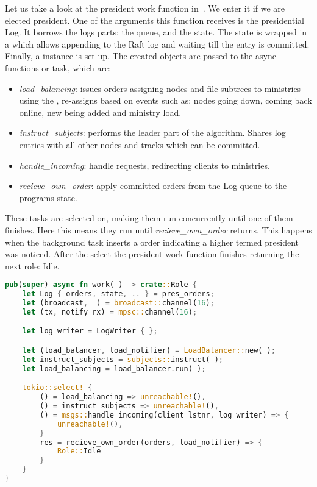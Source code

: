 Let us take a look at the president work function in~. We enter it if we are elected president. One of the arguments this function receives is the presidential \raft{} Log. It borrows the logs parts: the queue, and the \raft{} state. The state is wrapped in a  which allows appending to the Raft log and waiting till the entry is committed. Finally, a  instance is set up. The created objects are passed to the async functions or task, which are: 
\begin{itemize}
	\item \textsl{load\_balancing}: issues orders assigning nodes and file subtrees to ministries using the , re-assigns based on events such as: nodes going down, coming back online, new being added and ministry load.
	\item \textsl{instruct\_subjects}: performs the leader part of the \raft{} algorithm. Shares log entries with all other nodes and tracks which can be committed.
	\item \textsl{handle\_incoming}: handle requests, redirecting clients to ministries.
	\item \textsl{recieve\_own\_order}: apply committed orders from the \raft{} Log queue to the programs state.
\end{itemize}
%
These tasks are selected on, making them run concurrently until one of them finishes. Here this means they run until \textsl{recieve\_own\_order} returns. This happens when the \raft{} background task inserts a  order indicating a higher termed president was noticed. After the select the president work function finishes returning the next role: Idle.

%
\begin{lstlisting}[float,language=rust,style=boxed,tabsize=2,caption={The president work function, it performs all the tasks of the president. In this code snippet brackets and parenthesis containing whitespace mean the corrosponding structs and functions have there arguments hidden for brevity},label=lst:pres]
pub(super) async fn work( ) -> crate::Role {
	let Log { orders, state, .. } = pres_orders;
	let (broadcast, _) = broadcast::channel(16);
	let (tx, notify_rx) = mpsc::channel(16);

	let log_writer = LogWriter { };

	let (load_balancer, load_notifier) = LoadBalancer::new( );
	let instruct_subjects = subjects::instruct( );
	let load_balancing = load_balancer.run( );

	tokio::select! {
		() = load_balancing => unreachable!(),
		() = instruct_subjects => unreachable!(),
		() = msgs::handle_incoming(client_lstnr, log_writer) => {
			unreachable!(),
		}
		res = recieve_own_order(orders, load_notifier) => {
			Role::Idle
		}
	}
}
\end{lstlisting}

